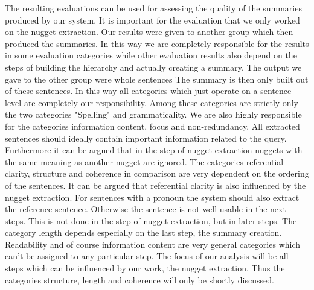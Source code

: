 The resulting evaluations can be used for assessing the quality of the summaries produced by our system. It is important for the evaluation that we only worked on the nugget extraction. Our results were given to another group which then produced the summaries. In this way we are completely responsible for the results in some evaluation categories while other evaluation results also depend on the steps of  building the hierarchy and actually creating a summary. The output we gave to the other group were whole sentences
The summary is then only built out of these sentences. In this way all categories which just operate on a sentence level are completely our responsibility. Among these categories are strictly only the two categories "Spelling" and grammaticality. We are also highly responsible for the categories information content, focus and non-redundancy. All extracted sentences should ideally contain important information related to the query. Furthermore it can be argued that in the step of nugget extraction nuggets with the same meaning as another nugget are ignored. The categories referential clarity, structure and coherence in comparison are very dependent on the ordering of the sentences. It can be argued that referential clarity is also influenced by the nugget extraction. For sentences with a pronoun the system should also extract the reference sentence. Otherwise the sentence is not well usable in the next steps. This is not done in the step of nugget extraction, but in later steps. The category length depends especially on the last step, the summary creation. Readability and of course information content are very general categories which can't be assigned to any particular step. The focus of our analysis will be all steps which can be influenced by our work, the nugget extraction. Thus the categories structure, length and coherence will only be shortly discussed.

